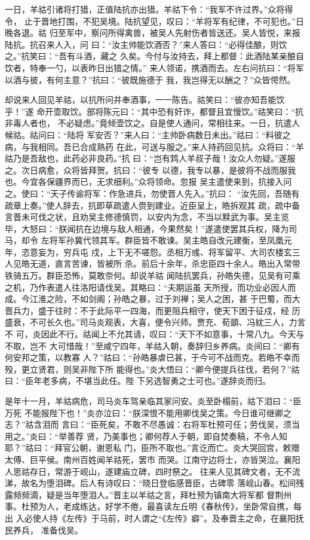 一日，羊祜引诸将打猎，正值陆抗亦出猎。羊祜下令：“我军不许过界。”众将得令，
止于晋地打围，不犯吴境。陆抗望见，叹曰：“羊将军有纪律，不可犯也。”日晚各退。祜
归至军中，察问所得禽兽，被吴人先射伤者皆送还。吴人皆悦，来报陆抗。抗召来人入，问
曰：“汝主帅能饮酒否？”来人答曰：“必得佳酿，则饮之。”抗笑曰：“吾有斗酒，藏之
久矣。今付与汝持去，拜上都督：此酒陆某亲酿自饮者，特奉一勺，以表昨日出猎之情。”
来人领诺，携酒而去。左右问抗曰：“将军以酒与彼，有何主意？”抗曰：“彼既施德于
我，我岂得无以酬之？”众皆愕然。

却说来人回见羊祜，以抗所问并奉酒事，一一陈告。祜笑曰：“彼亦知吾能饮乎！”遂
命开壶取饮。部将陈元曰：“其中恐有奸诈，都督且宜慢饮。”祜笑曰：“抗非毒人者也，
不必疑虑。”竟倾壶饮之。自是使人通问，常相往来。一日，抗遣人候祜。祜问曰：“陆将
军安否？”来人曰：“主帅卧病数日未出。”祜曰：“料彼之病，与我相同。吾已合成熟药
在此，可送与服之。”来人持药回见抗。众将曰：“羊祜乃是吾敌也，此药必非良药。”抗
曰：“岂有鸩人羊叔子哉！汝众人勿疑。”遂服之。次日病愈，众将皆拜贺。抗曰：“彼专
以德，我专以暴，是彼将不战而服我也。今宜各保疆界而已，无求细利。”众将领命。忽报
吴主遣使来到，抗接入问之。使曰：“天子传谕将军：作急进兵，勿使晋人先入。”抗曰：
“汝先回，吾随有疏章上奏。”使人辞去，抗即草疏遣人赍到建业。近臣呈上，皓拆观其
疏，疏中备言晋未可伐之状，且劝吴主修德慎罚，以安内为念，不当以黩武为事。吴主览
毕，大怒曰：“朕闻抗在边境与敌人相通，今果然矣！”遂遣使罢其兵权，降为司马，却令
左将军孙冀代领其军。群臣皆不敢谏。吴主皓自改元建衡，至凤凰元年，恣意妄为，穷兵屯
戍，上下无不嗟怨。丞相万彧、将军留平、大司农楼玄三人见皓无道，直言苦谏，皆被所
杀。前后十余年，杀忠臣四十余人。皓出入常带铁骑五万。群臣恐怖，莫敢奈何。却说羊祜
闻陆抗罢兵，孙皓失德，见吴有可乘之机，乃作表遣人往洛阳请伐吴。其略曰：“夫期运虽
天所授，而功业必因人而成。今江淮之险，不如剑阁；孙皓之暴，过于刘禅；吴人之困，甚
于巴蜀，而大晋兵力，盛于往时：不于此际平一四海，而更阻兵相守，使天下困于征戍，经
历盛衰，不可长久也。”司马炎观表，大喜，便令兴师。贾充、荀顗、冯紞三人，力言不
可，炎因此不行。祜闻上不允其请，叹曰：“天下不如意事，十常八九。今天与不取，岂不
大可惜哉！”至咸宁四年，羊祜入朝，奏辞归乡养病。炎间曰：“卿有何安邦之策，以教寡
人？”祜曰：“孙皓暴虐已甚，于今可不战而克。若皓不幸而殁，更立贤君，则吴非陛下所
能得也。”炎大悟曰：“卿今便提兵往伐，若何？”祜曰：“臣年老多病，不堪当此任。陛
下另选智勇之士可也。”遂辞炎而归。

是年十一月，羊祜病危，司马炎车驾亲临其家问安。炎至卧榻前，祜下泪曰：“臣万死
不能报陛下也！”炎亦泣曰：“朕深恨不能用卿伐吴之策。今日谁可继卿之志？”祜含泪而
言曰：“臣死矣，不敢不尽愚诚：右将军杜预可任；劳伐吴，须当用之。”炎曰：“举善荐
贤，乃美事也；卿何荐人于朝，即自焚奏稿，不令人知耶？”祜曰：“拜官公朝，谢恩私
门，臣所不取也。”言讫而亡。炎大哭回宫，敕赠太傅、巨平侯。南州百姓闻羊祜死，罢市
而哭。江南守边将士，亦皆哭泣。襄阳人思祜存日，常游于岘山，遂建庙立碑，四时祭之。
往来人见其碑文者，无不流涕，故名为堕泪碑。后人有诗叹曰：“晓日登临感晋臣，古碑零
落岘山春。松间残露频频滴，疑是当年堕泪人。”晋主以羊祜之言，拜杜预为镇南大将军都
督荆州事。杜预为人，老成练达，好学不倦，最喜读左丘明《春秋传》，坐卧常自携，每出
入必使人持《左传》于马前，时人谓之“《左传》癖”。及奉晋主之命，在襄阳抚民养兵，
准备伐吴。

